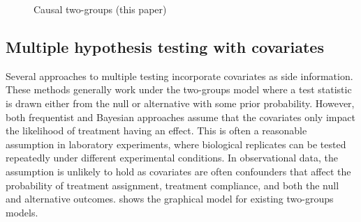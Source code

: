 \begin{figure*}[t]
\begin{subfigure}{0.23\linewidth}
{}
\caption{\label{fig:causal_2g_model}Causal two-groups \newline (this paper) \newline \mbox { }}
\end{subfigure}
\caption{\label{fig:graphical_models}
(a) The FDR regression model of \citet{scott:etal:2014:fdr-regression}.
(b) An observational dataset with observed noncompliance \citep{frangakis:rubin:2002:principal-stratification}.
(c) A randomized controlled trial with a compliance proxy \citep{boatman:etal:2017:compliance-error}.
(d) The general causal two-groups model. The treatment $T$, (unobserved) treatment effect indicator $H$, and the outcome $Y$ are all confounded by $X$. The causal two-groups model generalizes other scenarios such as those in (a) and (b).}
\end{figure*}

\subsection{Multiple hypothesis testing with covariates}
\label{subsec:background:multiple-testing}
%
Several approaches to multiple testing incorporate covariates as side information. These methods generally work under the two-groups model \citep{efron:2004,efron:2008,efron2012} where a test statistic is drawn either from the null or alternative with some prior probability. However, both frequentist \citep{ignatiadis:etal:2016:ihw,xia:etal:2017:neuralfdr,lei:fithian:2018:adapt,chen:etal:2018:functional-fdr,li:barber:2019:sabha} and Bayesian \citep{scott:etal:2014:fdr-regression,patra:bodhi:2016:2groups-jrssb,tansey:etal:2018:fdr-smoothing,tansey:etal:icml:2018:bbfdr} approaches assume that the covariates only impact the likelihood of treatment having an effect. This is often a reasonable assumption in laboratory experiments, where biological replicates can be tested repeatedly under different experimental conditions. In observational data, the assumption is unlikely to hold as covariates are often confounders that affect the probability of treatment assignment, treatment compliance, and both the null and alternative outcomes.  shows the graphical model for existing two-groups models.


